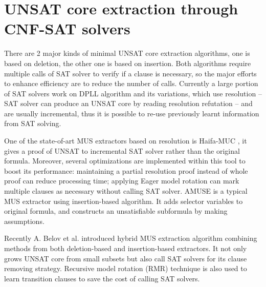 \section{UNSAT core extraction through CNF-SAT solvers}
There are 2 major kinds of minimal UNSAT core extraction algorithms,
one is based on deletion,  the other one is based on insertion. Both
algorithms require multiple calls of SAT solver to verify if a clause
is necessary,  so the major efforts to enhance efficiency are to
reduce the number of calls. Currently a large portion of SAT solvers
work on DPLL algorithm and its variations,  which use resolution --
SAT solver can produce an UNSAT core by reading resolution refutation
-- and are usually incremental,  thus it is possible to re-use
previously learnt information from SAT solving. 

One of the state-of-art MUS extractors based on resolution is
Haifa-MUC \cite{Haifa2014}, it gives a proof of UNSAT to incremental
SAT solver rather than the original formula. Moreover,  several
optimizations are implemented within this tool to boost its
performance: maintaining a partial resolution proof instead of whole
proof can reduce processing time; applying Eager model rotation can
mark multiple clauses as necessary without calling  SAT solver. AMUSE
\cite{AMUSE} is a typical MUS extractor using insertion-based
algorithm. It adds selector variables to original formula,  and
constructs an unsatisfiable subformula by making assumptions. 

Recently A. Belov et al. \cite{Joao2012} introduced hybrid MUS
extraction algorithm combining methods from  both deletion-based and
insertion-based extractors. It not only grows UNSAT core from small
subsets but also call SAT solvers for its clause removing
strategy. Recursive model rotation (RMR) technique is also used to
learn transition clauses to save the cost of calling SAT solvers. 

